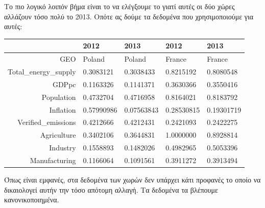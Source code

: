 \documentclass[a4paper,twoside,10pt]{article}
\begin{document}
	Το πιο λογικό λοιπόν βήμα είναι το να ελέγξουμε το γιατί αυτές οι δύο χώρες αλλάζουν τόσο πολύ το 2013. Οπότε ας δούμε τα δεδομένα που χρησιμοποιούμε για αυτές:
	\begin{table}[H]
		\centering
		\begin{tabular}{rllll}
			\hline
			& 2012 & 2013 & 2012 & 2013 \\
			\hline
			GEO & Poland & Poland & France & France \\
			Total\_energy\_supply & 0.3083121 & 0.3038433 & 0.8215192 & 0.8080548 \\ 
			GDPpc & 0.1163326 & 0.1141371 & 0.3630366 & 0.3550416 \\
			Population & 0.4732704 & 0.4716958 & 0.8164021 & 0.8183792 \\
			Inflation & 0.57990986 & 0.07563843 & 0.28530815 & 0.19301719 \\ 
			Verified\_emissions & 0.4212666 & 0.4212431 & 0.2421093 & 0.2422275 \\
			Agriculture & 0.3402106 & 0.3644831 & 1.0000000 & 0.8928814 \\
			Industry & 0.1558893 & 0.1482026 & 0.4982965 & 0.5053396 \\
			Manufacturing & 0.1166064 & 0.1091561 & 0.3911272 & 0.3913494 \\ 
			\hline
		\end{tabular}
	\end{table}
	Όπως είναι εμφανές, στα δεδομένα των χωρών δεν υπάρχει κάτι προφανές το οποίο να δικαιολογεί αυτήν την τόσο απότομη αλλαγή. Τα δεδομένα τα βλέπουμε κανονικοποιημένα.
	
\end{document}
